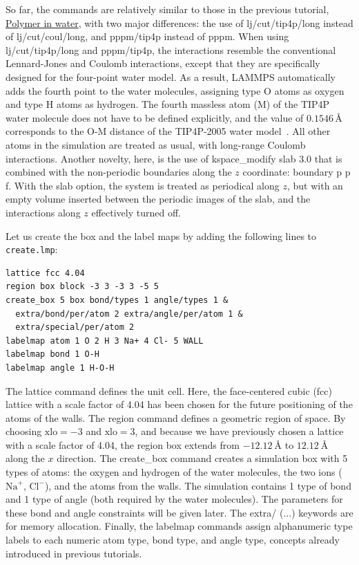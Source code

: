 \documentclass[9pt,tutorial]{livecoms}
\newcommand{\lmpcmd}[1]{\colorbox{listing}{\textcolor{command}{\small{#1}}}} %
\newcommand{\flecmd}[1]{\textcolor{command}{\texttt{#1}}} %
\begin{document}
So far, the commands are relatively similar to those in the previous tutorial,
\hyperref[all-atom-label]{Polymer in water}, with two major differences: the use
of \lmpcmd{lj/cut/tip4p/long} instead of \lmpcmd{lj/cut/coul/long}, and \lmpcmd{pppm/tip4p}
instead of \lmpcmd{pppm}.  When using \lmpcmd{lj/cut/tip4p/long} and \lmpcmd{pppm/tip4p},
the interactions resemble the conventional Lennard-Jones and Coulomb interactions,
except that they are specifically designed for the four-point water model.  As a result,
LAMMPS automatically adds the fourth point to the water molecules, assigning type O
atoms as oxygen and type H atoms as hydrogen.  The fourth massless atom (M) of the
TIP4P water molecule does not have to be defined explicitly, and the value of
$0.1546\,\text{\AA{}}$ corresponds to the O-M distance of the
TIP4P-2005 water model~\cite{abascal2005general}.  All other atoms in the simulation
are treated as usual, with long-range Coulomb interactions.  Another novelty, here, is
the use of \lmpcmd{kspace\_modify slab 3.0} that is combined with the non-periodic
boundaries along the $z$ coordinate: \lmpcmd{boundary p p f}.  With the \lmpcmd{slab}
option, the system is treated as periodical along $z$, but with an empty volume inserted
between the periodic images of the slab, and the interactions along $z$ effectively turned off.

Let us create the box and the label maps by adding the following lines to \flecmd{create.lmp}:
\begin{lstlisting}
lattice fcc 4.04
region box block -3 3 -3 3 -5 5
create_box 5 box bond/types 1 angle/types 1 &
  extra/bond/per/atom 2 extra/angle/per/atom 1 &
  extra/special/per/atom 2
labelmap atom 1 O 2 H 3 Na+ 4 Cl- 5 WALL
labelmap bond 1 O-H
labelmap angle 1 H-O-H
\end{lstlisting}
The \lmpcmd{lattice} command defines the unit cell.  Here, the face-centered cubic (fcc) lattice
with a scale factor of 4.04 has been chosen for the future positioning of the atoms
of the walls.  The \lmpcmd{region} command defines a geometric region of space.  By choosing
$\text{xlo}=-3$ and $\text{xlo}=3$, and because we have previously chosen a lattice with a scale
factor of 4.04, the region box extends from $-12.12~\text{\AA{}}$ to $12.12~\text{\AA{}}$
along the $x$ direction.  The \lmpcmd{create\_box} command creates a simulation box with
5 types of atoms: the oxygen and hydrogen of the water molecules, the two ions ($\text{Na}^+$,
$\text{Cl}^-$), and the atoms from the walls.  The simulation contains 1 type of bond
and 1 type of angle (both required by the water molecules).
The parameters for these bond and angle constraints will be given later.  The \lmpcmd{extra/ (...)}
keywords are for memory allocation.  Finally, the \lmpcmd{labelmap} commands assign
alphanumeric type labels to each numeric atom type, bond type, and angle type,
concepts already introduced in previous tutorials.
\end{document}

